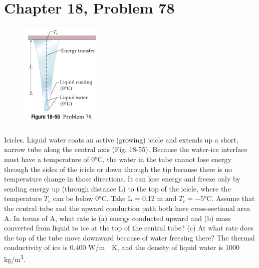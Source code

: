 \documentclass{article}
\begin{document}
    \section{Chapter 18, Problem 78}
        \begin{figure}
            \vspace{-50pt}
            \includegraphics[width=0.35\textwidth]{picture_18-55.png} 
        \end{figure}
        Icicles. Liquid water coats an active (growing) icicle and extends up a short, narrow tube along the central axis (Fig. 18-55). 
        Because the water-ice interface must have a temperature of 0\unit{\celsius}, the water in the tube cannot lose energy through the sides of the icicle or down through the tip because there is no temperature change in those directions. 
        It can lose energy and freeze only by sending energy up (through distance L) to the top of the icicle, where the temperature $T_r$ can be below 0\unit{\celsius}. 
        Take L = 0.12 m and $T_r = -5\unit{\celsius}$. 
        Assume that the central tube and the upward conduction path both have cross-sectional area A. 
        In terms of A, what rate is (a) energy conducted upward and (b) mass converted from liquid to ice at the top of the central tube? 
        (c) At what rate does the top of the tube move downward because of water freezing there? 
        The thermal conductivity of ice is 0.400 \unit{\watt/\meter\cdot\kelvin}, and the density of liquid water is 1000 \unit{\kilo\gram/\meter^3}.

    \pagebreak
\end{document}
